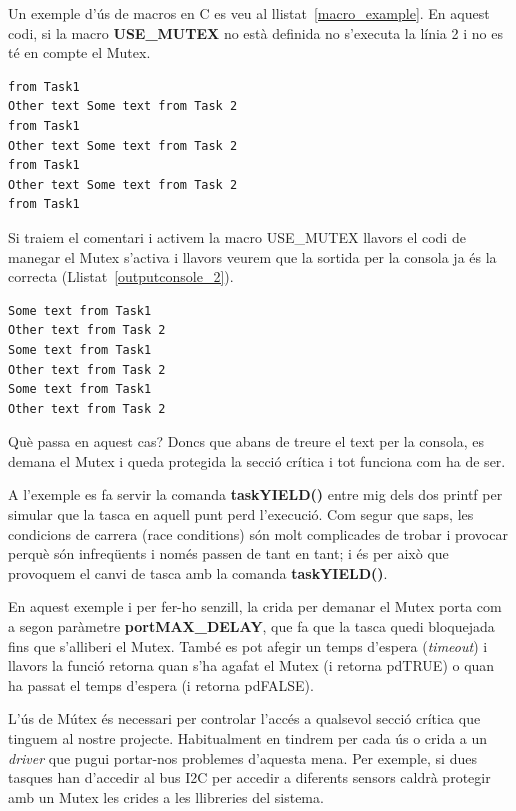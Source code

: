 \begin{remark}
 Un exemple d'ús de macros en C es veu al llistat~\ref{macro_example}. En aquest codi, si la macro {\bf USE\_MUTEX} no està definida no s'executa la línia 2 i no es té en compte el Mutex.
\end{remark}


\begin{lstlisting}[style=customc, label=outputconsole_1, caption=Sortida de la consola sense Mutex]
from Task1
Other text Some text from Task 2
from Task1
Other text Some text from Task 2
from Task1
Other text Some text from Task 2
from Task1
\end{lstlisting}

Si traiem el comentari i activem la macro USE\_MUTEX llavors el codi de manegar el Mutex s'activa i llavors veurem que la sortida per la consola ja és la correcta (Llistat~\ref{outputconsole_2}).
\begin{lstlisting}[style=customc, label=outputconsole_2, caption=Sortida de la consola amb Mutex]
Some text from Task1
Other text from Task 2
Some text from Task1
Other text from Task 2
Some text from Task1
Other text from Task 2
\end{lstlisting}

Què passa en aquest cas? Doncs que abans de treure el text per la consola, es demana el Mutex i queda protegida la secció crítica i tot funciona com ha de ser.

A l'exemple es fa servir la comanda {\bf taskYIELD()} entre mig dels dos printf per simular que la tasca en aquell punt perd l'execució. Com segur que saps, les condicions de carrera (\glspl{race condition}) són molt complicades de trobar i provocar perquè són infreqüents i només passen de tant en tant; i és per això que provoquem el canvi de tasca amb la comanda {\bf taskYIELD()}.

En aquest exemple i per fer-ho senzill, la crida per demanar el Mutex porta com a segon paràmetre {\bf portMAX\_DELAY}, que fa que la tasca quedi bloquejada fins que s'alliberi el Mutex. També es pot afegir un temps d'espera ({\em timeout}) i llavors la funció retorna quan s'ha agafat el Mutex (i retorna \gls{pdTRUE}) o quan ha passat el temps d'espera (i retorna \gls{pdFALSE}).

L'ús de Mútex és necessari per controlar l'accés a qualsevol secció crítica que tinguem al nostre projecte. Habitualment en tindrem per cada ús o crida a un {\em driver} que pugui portar-nos problemes d'aquesta mena. Per exemple, si dues tasques han d'accedir al bus \gls{I2C} per accedir a diferents sensors caldrà protegir amb un Mutex les crides a les llibreries del sistema.

